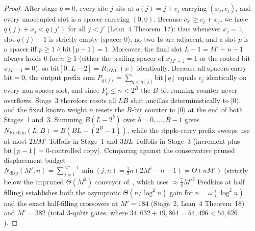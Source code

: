 \documentclass[11pt,a4paper]{article}
\theoremstyle{remark}
\newcommand{\ket}[1]{\lvert #1 \rangle}
\begin{document}
\begin{proof}
After stage $b = 0$, every site $j$ sits at $q(j) = j + c_j$ carrying $(x_j, c_j)$, and every unoccupied slot is a spacer carrying $(0, 0)$. Because $c_{j'} \ge c_j + x_j$, we have $q(j) + x_j < q(j')$ for all $j < j'$ (Lean~4 Theorem~17): thus whenever $x_j = 1$, slot $q(j) + 1$ is strictly empty (spacer $0$), no two $1$s are adjacent, and a slot $p$ is a spacer iff $p \ge 1 \wedge \mathrm{bit}[p-1] = 1$. Moreover, the final slot $L - 1 = M' + n - 1$ always holds $0$ for $n \ge 1$ (either the trailing spacer of $x_{M'-1}=1$ or the routed bit $x_{M'-1}=0$), so $\mathrm{bit}[0..L-2] = R_{\mathrm{DWC}}(x)$ identically. Because all spacers carry $\mathrm{bit} = 0$, the output prefix sum $P_{q(j)} = \sum_{q < q(j)} \mathrm{bit}[q]$ equals $c_j$ identically on every non-spacer slot, and since $P_p \le n < 2^B$ the $B$-bit running counter never overflows. Stage~3 therefore resets all $LB$ shift ancillas deterministically to $\ket{0}$, and the fixed known weight $n$ resets the $B$-bit counter to $\ket{0}$ at the end of both Stages~1 and~3. Summing $B(L - 2^b)$ over $b = 0, \dots, B-1$ gives $N_{\mathrm{Fredkin}}(L, B) = B(B L - (2^B - 1))$, while the ripple-carry prefix sweeps use at most $2 B M'$ Toffolis in Stage~1 and $3 B L$ Toffolis in Stage~3 (increment plus $\mathrm{bit}[p-1]=0$-controlled copy). Comparing against the conservative pruned displacement budget $N_{\mathrm{disp}}(M', n) = \sum_{j=1}^{M'-1} \min(j, n) = \frac{1}{2} n(2M' - n - 1) = \Theta(n M')$ (strictly below the unpruned $\Theta(M^2)$ conveyor of~\cite{AKN26}, which uses $\approx \frac{7}{8}M'^2$ Fredkins at half filling) establishes both the asymptotic $\Theta(n/\log^2 n)$ gain for $n = \omega(\log^2 n)$ and the exact half-filling crossovers at $M' = 184$ (Stage~2, Lean~4 Theorem~18) and $M' = 382$ (total 3-qubit gates, where $34{,}632 + 19{,}864 = 54{,}496 < 54{,}626$).
\end{proof}
\end{document}
